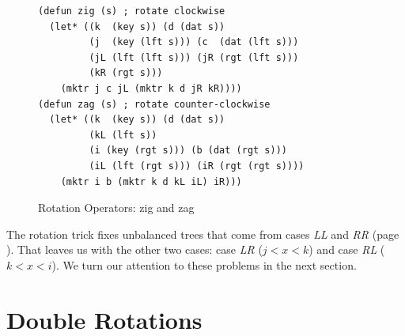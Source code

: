 \begin{figure}
\begin{center}
\begin{code}
\begin{verbatim}
(defun zig (s) ; rotate clockwise
  (let* ((k  (key s)) (d (dat s))
         (j  (key (lft s))) (c  (dat (lft s)))
         (jL (lft (lft s))) (jR (rgt (lft s)))
         (kR (rgt s)))
    (mktr j c jL (mktr k d jR kR))))
(defun zag (s) ; rotate counter-clockwise
  (let* ((k  (key s)) (d (dat s))
         (kL (lft s))
         (i (key (rgt s))) (b (dat (rgt s)))
         (iL (lft (rgt s))) (iR (rgt (rgt s))))
    (mktr i b (mktr k d kL iL) iR)))
\end{verbatim}
\end{code}
\end{center}
\caption{Rotation Operators: \textsf{zig} and \textsf{zag}}
\label{defun:zig-and-zag}
\end{figure}

The rotation trick fixes unbalanced trees that come
from cases \emph{LL} and \emph{RR} (page \pageref{cases:ht-n+2}).
That leaves us with the other two cases:
case \emph{LR} ($j < x < k$) and
case \emph{RL} ($k < x < i$).
We turn our attention to these problems in the next section.

\begin{exercises}
\end{exercises}

\section{Double Rotations}

